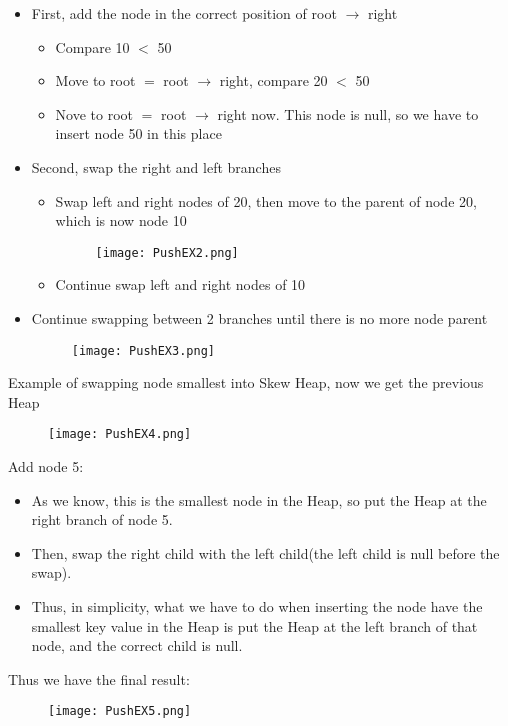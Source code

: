 \documentclass[12pt, a4paper]{article}
\begin{document}
\begin{itemize}
    \item First, add the node in the correct position of root $\to$ right 
    \begin{itemize}
        \item Compare 10 $<$ 50
        \item Move to root $=$ root $\to$ right, compare 20 $<$ 50
        \item Nove to root $=$ root $\to$ right now. This node is null, so we have to insert node 50 in this place
    \end{itemize}
    \item Second, swap the right and left branches
    \begin{itemize}
        \item Swap left and right nodes of 20, then move to the parent of node 20, which is now node 10
        \begin{figure}[H]
            \begin{center}
                \texttt{[image: PushEX2.png]}
            \end{center}
        \end{figure}
        \item Continue swap left and right nodes of 10
    \end{itemize}
    \item Continue swapping between 2 branches until there is no more node parent
    \begin{figure}[H]
        \begin{center}
            \texttt{[image: PushEX3.png]}
        \end{center}
    \end{figure}
\end{itemize}

Example of swapping node smallest into Skew Heap, now we get the previous Heap
\begin{figure}[H]
    \begin{center}
        \texttt{[image: PushEX4.png]}
    \end{center}
\end{figure}
Add node 5:
\begin{itemize}
    \item As we know, this is the smallest node in the Heap, so put the Heap at the right branch of node 5.
    \item Then, swap the right child with the left child(the left child is null before the swap).
    \item Thus, in simplicity, what we have to do when inserting the node have the smallest key value in the Heap is put the Heap at the left branch of that node, and the correct child is null.
\end{itemize}
Thus we have the final result:
\begin{figure}[H]
    \begin{center}
        \texttt{[image: PushEX5.png]}
    \end{center}
\end{figure}
\pagebreak
\end{document}
